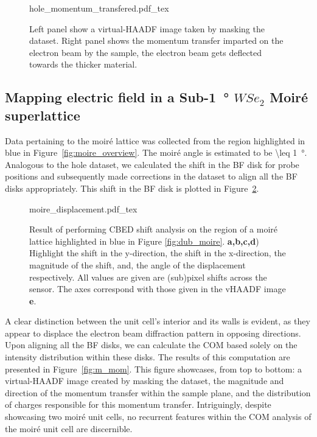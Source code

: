 \begin{figure}
    \centering
    \def\svgwidth{.7\linewidth}
    {hole_momentum_transfered.pdf_tex}
    \caption{Left panel show a virtual-HAADF image taken by masking the dataset. Right panel shows the momentum transfer imparted on the electron beam by the sample, the electron beam gets deflected towards the thicker material.}
    \label{fig:hole_mom}
\end{figure}

\subsection{Mapping electric field in a Sub-\SI{1}{\degree} $WSe_2$ Moiré superlattice}

Data pertaining to the moiré lattice was collected from the region highlighted in blue in Figure~\ref{fig:moire_overview}.
%
The moiré angle is estimated to be \SI{\leq 1}{\degree}. Analogous to the hole dataset, we calculated the shift in the BF disk for probe positions and subsequently made corrections in the dataset to align all the BF disks appropriately. This shift in the BF disk is plotted in Figure~\ref{fig:m_dis}. 

\begin{figure}[h]
    \centering
    \def\svgwidth{.95\linewidth}
    {moire_displacement.pdf_tex}
    \caption{Result of performing CBED shift analysis on the region of a moiré lattice highlighted in blue in Figure \ref{fig:dub_moire}. \textbf{a,b,c,d}) Highlight the shift in the y-direction, the shift in the x-direction, the magnitude of the shift, and, the angle of the displacement respectively. All values are given are (sub)pixel shifts across the sensor. The axes correspond with those given in the vHAADF image \textbf{e}.}
    \label{fig:m_dis}
\end{figure}

A clear distinction between the unit cell's interior and its walls is evident, as they appear to displace the electron beam diffraction pattern in opposing directions.
%
Upon aligning all the BF disks, we can calculate the COM based solely on the intensity distribution within these disks.
%
The results of this computation are presented in Figure~\ref{fig:m_mom}. 
%
This figure showcases, from top to bottom: a virtual-HAADF image created by masking the dataset, the magnitude and direction of the momentum transfer within the sample plane, and the distribution of charges responsible for this momentum transfer. 
%
Intriguingly, despite showcasing two moiré unit cells, no recurrent features within the COM analysis of the moiré unit cell are discernible.

